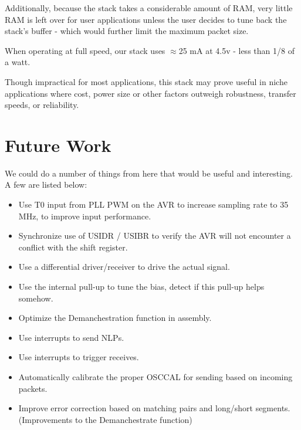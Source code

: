 \documentclass[13pt]{ltxdoc}
\begin{document}
Additionally, because the stack takes a considerable amount of RAM, very little RAM is left over for user
applications unless the user decides to tune back the stack's buffer - which would further limit the 
maximum packet size.

When operating at full speed, our stack uses $\approx$25 mA at 4.5v - less than 1/8 of a watt.

Though impractical for most applications, this stack may prove useful in niche applications where 
cost, power size or other factors outweigh robustness, transfer speeds, or reliability.

\section{Future Work}
We could do a number of things from here that would be useful and interesting.  A few are listed below:

\begin{itemize}
\item Use T0 input from PLL PWM on the AVR to increase sampling rate to 35 MHz, to improve input performance.
\item Synchronize use of USIDR / USIBR to verify the AVR will not encounter a conflict with the shift register.
\item Use a differential driver/receiver to drive the actual signal.
\item Use the internal pull-up to tune the bias, detect if this pull-up helps somehow.
\item Optimize the Demanchestration function in assembly.
\item Use interrupts to send NLPs.
\item Use interrupts to trigger receives.
\item Automatically calibrate the proper OSCCAL for sending based on incoming packets.
\item Improve error correction based on matching pairs and long/short segments. (Improvements to the Demanchestrate function)
\end{itemize}
\end{document}

